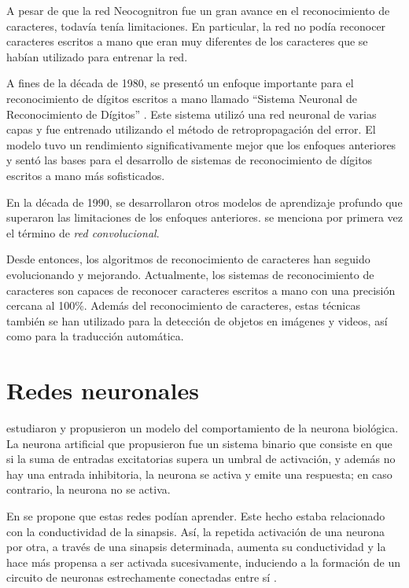 A pesar de que la red Neocognitron fue un gran avance en el reconocimiento de caracteres, todavía tenía limitaciones.
En particular, la red no podía reconocer caracteres escritos a mano que eran muy diferentes de los caracteres que se
habían utilizado para entrenar la red.

A fines de la década de 1980, se presentó un enfoque importante para el reconocimiento de dígitos escritos a mano
llamado ``Sistema Neuronal de Reconocimiento de Dígitos'' \parencite{lecun1989backpropagation}. Este sistema utilizó una red neuronal de varias capas y fue entrenado utilizando el
método de retropropagación del error. El modelo tuvo un rendimiento significativamente mejor que los enfoques
anteriores y sentó las bases para el desarrollo de sistemas de reconocimiento de dígitos escritos a mano más
sofisticados.

En la década de 1990, se desarrollaron otros modelos de aprendizaje profundo que superaron las limitaciones de los
enfoques anteriores. \cite{lecun1995learning} se menciona por primera vez el término de {\it red convolucional}.

Desde entonces, los algoritmos de reconocimiento de caracteres han seguido evolucionando y mejorando. Actualmente, los
sistemas de reconocimiento de caracteres son capaces de reconocer caracteres escritos a mano con una precisión cercana
al 100\%. Además del reconocimiento de caracteres, estas técnicas también se han utilizado para la detección de objetos
en imágenes y videos, así como para la traducción automática.

\section{Redes neuronales}
\cite{mcculloch1943logical} estudiaron y propusieron un modelo del comportamiento de la
neurona biológica. La neurona artificial que propusieron fue un sistema binario que consiste en que si la suma de entradas excitatorias supera un umbral de activación, y además no
hay una entrada inhibitoria, la neurona se activa y emite una respuesta; en caso contrario, la neurona no se activa.

En \citeyear{hebb1949organization} se propone que estas redes podían aprender. Este hecho estaba relacionado con la
conductividad de la sinapsis. Así, la repetida activación de una neurona por otra, a través de una sinapsis
determinada, aumenta su conductividad y la hace más propensa a ser activada sucesivamente, induciendo a la formación de
un circuito de neuronas estrechamente conectadas entre sí \parencite{hebb1949organization}.

